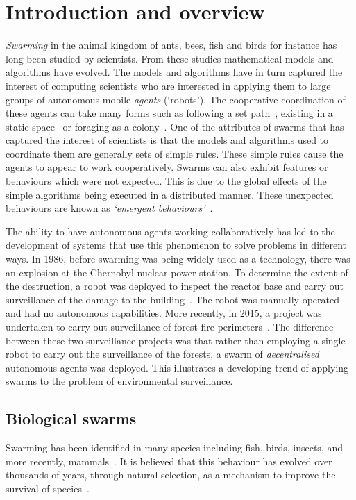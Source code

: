 \chapter{Introduction and overview}\label{introduction}
\emph{Swarming} in the animal kingdom of ants, bees, fish and birds for instance has long been studied by scientists. From these studies mathematical models and algorithms have evolved. The models and algorithms have in turn captured the interest of computing scientists who are interested in applying them to large groups of autonomous mobile \emph{agents} (`robots'). The cooperative coordination of these agents can take many forms such as following a set path~\cite{HCS:09}, existing in a static space~\cite{EP:10, GP:02, GP:04} or foraging as a colony~\cite{HER:11, GK:07}. One of the attributes of swarms that has captured the interest of scientists is that the models and algorithms used to coordinate them are generally sets of simple rules. These simple rules cause the agents to appear to work cooperatively. Swarms can also exhibit features or behaviours which were not expected. This is due to the global effects of the simple algorithms being executed in a distributed manner. These unexpected behaviours are known as \emph{`emergent behaviours'}~\cite{RM:11, RMT:15}.

The ability to have autonomous agents working collaboratively has led to the development of systems that use this phenomenon to solve problems in different ways. In 1986, before swarming was being widely used as a technology, there was an explosion at the Chernobyl nuclear power station. To determine the extent of the destruction, a robot was deployed to inspect the reactor base and carry out surveillance of the damage to the building~\cite{JA:98}. The robot was manually operated and had no autonomous capabilities. More recently, in 2015, a project was undertaken to carry out surveillance of forest fire perimeters~\cite{BSB:15}. The difference between these two surveillance projects was that rather than employing a single robot to carry out the surveillance of the forests, a swarm of \emph{decentralised} autonomous agents was deployed. This illustrates a developing trend of applying swarms to the problem of environmental surveillance. 

\section{Biological swarms}
Swarming has been identified in many species including fish, birds, insects, and more recently, mammals~\cite{SFDCIC:15}. It is believed that this behaviour has evolved over thousands of years, through natural selection, as a mechanism to improve the survival of species~\cite{CZ:07}.

